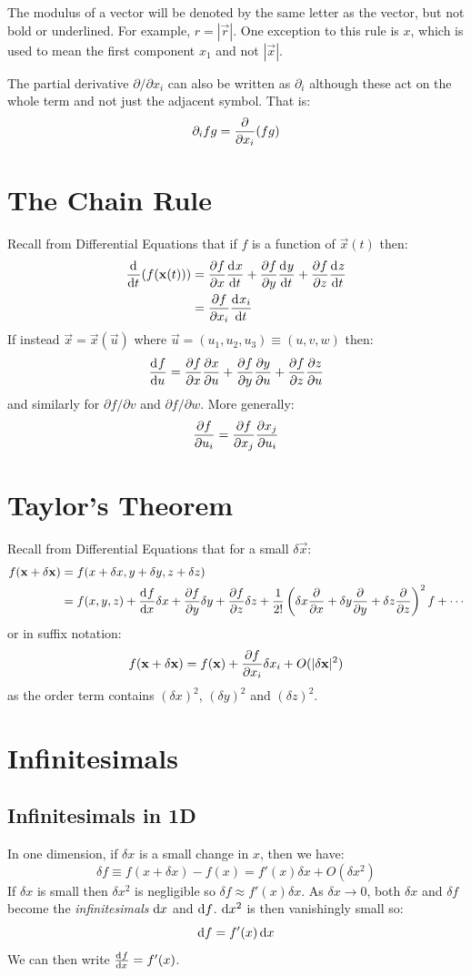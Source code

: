 \documentclass[../main.tex]{subfiles}
\begin{document}
The modulus of a  vector will be denoted by the same letter as the vector, but not bold or underlined.
For example, $r = |\vec{r}|$.
One exception to this rule is $x$, which is used to mean the first component $x_1$ and not $|\vec{x}|$.

The partial derivative $\partial/\partial x_i$ can also be written as $\partial_i$ although these act on the whole term and not just the adjacent symbol.
That is:
\[
  \partial_i fg = \pderiv{}{x_i}(fg)
\]
\section{The Chain Rule}
\label{MVC}
Recall from Differential Equations that if $f$ is a function of $\vec{x}(t)$ then:
\begin{align*}
  \deriv{}{t}(f(\vec{x}(t))) &= \pderiv{f}{x} \deriv{x}{t} + \pderiv{f}{y} \deriv{y}{t} + \pderiv{f}{z} \deriv{z}{t} \\
                             &= \pderiv{f}{x_i} \deriv{x_i}{t}
\end{align*}
If instead $\vec{x} = \vec{x}(\vec{u})$ where $\vec{u} = (u_1, u_2, u_3) \equiv (u, v, w)$ then:
\[
  \deriv{f}{u} = \pderiv{f}{x} \pderiv{x}{u} + \pderiv{f}{y} \pderiv{y}{u} + \pderiv{f}{z} \pderiv{z}{u}
\]
and similarly for $\partial f/\partial v$ and $\partial f/\partial w$.
More generally:
\[
  \pderiv{f}{u_i} = \pderiv{f}{x_j} \pderiv{x_j}{u_i}
\]
\section{Taylor's Theorem}
Recall from Differential Equations that for a small $\delta \vec{x}$:
\begin{align*}
  f(\vec{x} + \delta \vec{x}) &= f(x + \delta x, y + \delta y, z + \delta z) \\
                              &= f(x, y, z) + \deriv{f}{x}\delta x + \pderiv{f}{y} \delta y + \pderiv{f}{z} \delta z + \frac{1}{2!}\left(\delta x \pderiv{}{x} + \delta y \pderiv{}{y} + \delta z \pderiv{}{z}\right)^2 f + \cdots
\end{align*}
or in suffix notation:
\[
  f(\vec{x} + \delta \vec{x}) = f(\vec{x}) + \pderiv{f}{x_i}\delta x_i + O(|\delta \vec{x}|^2)
\]
as the order term contains $(\delta x)^2$, $(\delta y)^2$ and $(\delta z)^2$.
\section{Infinitesimals}
\subsection{Infinitesimals in 1D}
In one dimension, if $\delta x$ is a small change in $x$, then we have:
\[
  \delta f \equiv f(x + \delta x) - f(x) = f'(x)\delta x + O(\delta x^2)
\]
If $\delta x$ is small then $\delta x^2$ is negligible so $\delta f \approx f'(x)\delta x$.
As $\delta x \to 0$, both $\delta x$ and $\delta f$ become the \textit{infinitesimals} $\d{x}$ and $\d{f}$.
$\d{x^2}$ is then vanishingly small so:
\[
  \d{f} = f'(x) \d{x}
\]
We can then write $\deriv{f}{x} = f'(x)$.
\end{document}
